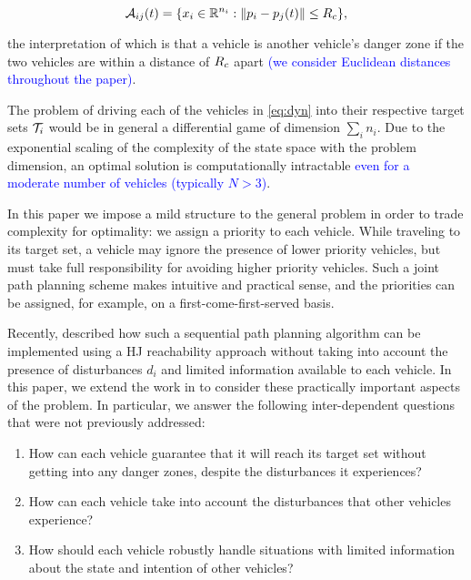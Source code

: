 \begin{equation}
\mathcal{A}_{ij}(t) = \{x_i \in \mathbb{R}^{n_i}: \|p_i - p_j(t)\| \le R_c \},
\end{equation}

\noindent the interpretation of which is that a vehicle is another vehicle's danger zone if the two vehicles are within a distance of $R_c$ apart \textcolor{blue}{(we consider Euclidean distances throughout the paper)}.

The problem of driving each of the vehicles in \eqref{eq:dyn} into their respective target sets $\mathcal{T}_i$ would be in general a differential game of dimension $\sum_i n_i$. Due to the exponential scaling of the complexity of the state space with the problem dimension, an optimal solution is computationally intractable \textcolor{blue}{even for a moderate number of vehicles (typically $N>3$)}.

In this paper we impose a mild structure to the general problem in order to trade complexity for optimality: we assign a priority to each vehicle.  While traveling to its target set, a vehicle may ignore the presence of lower priority vehicles, but must take full responsibility for avoiding higher priority vehicles. Such a joint path planning scheme makes intuitive and practical sense, and the priorities can be assigned, for example, on a first-come-first-served basis.

Recently, \cite{Chen15} described how such a sequential path planning algorithm can be implemented using a HJ reachability approach without taking into account the presence of disturbances $d_i$ and limited information available to each vehicle. In this paper, we extend the work in \cite{Chen15} to consider these practically important aspects of the problem. In particular, we answer the following inter-dependent questions that were not previously addressed:

\begin{enumerate}
\item How can each vehicle guarantee that it will reach its target set without getting into any danger zones, despite the disturbances it experiences?
\item How can each vehicle take into account the disturbances that other vehicles experience?
\item How should each vehicle robustly handle situations with limited information about the state and intention of other vehicles?
\end{enumerate}